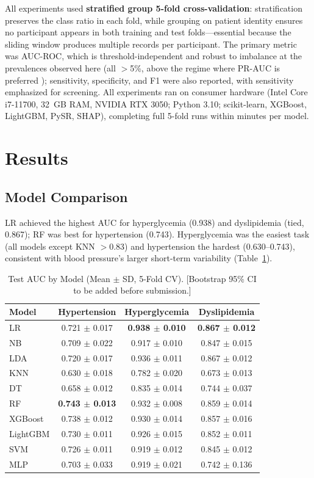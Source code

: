 \documentclass[journal]{IEEEtran}
\begin{document}
All experiments used \textbf{stratified group 5-fold cross-validation}: stratification preserves the class ratio in each fold, while grouping on patient identity ensures no participant appears in both training and test folds---essential because the sliding window produces multiple records per participant. The primary metric was AUC-ROC, which is threshold-independent and robust to imbalance at the prevalences observed here (all $>$5\%, above the regime where PR-AUC is preferred \cite{ref35}); sensitivity, specificity, and F1 were also reported, with sensitivity emphasized for screening. All experiments ran on consumer hardware (Intel Core i7-11700, 32~GB RAM, NVIDIA RTX 3050; Python 3.10; scikit-learn, XGBoost, LightGBM, PySR, SHAP), completing full 5-fold runs within minutes per model.

\section{Results}
\subsection{Model Comparison}
LR achieved the highest AUC for hyperglycemia (0.938) and dyslipidemia (tied, 0.867); RF was best for hypertension (0.743). Hyperglycemia was the easiest task (all models except KNN $>$0.83) and hypertension the hardest (0.630--0.743), consistent with blood pressure's larger short-term variability (Table~\ref{tab:auc}).

\begin{table}[!t]
\caption{Test AUC by Model (Mean $\pm$ SD, 5-Fold CV). [Bootstrap 95\% CI to be added before submission.]}
\label{tab:auc}
\centering
\begin{tabular}{@{}lccc@{}}
\toprule
Model & Hypertension & Hyperglycemia & Dyslipidemia \\
\midrule
LR & 0.721 $\pm$ 0.017 & \textbf{0.938 $\pm$ 0.010} & \textbf{0.867 $\pm$ 0.012} \\
NB & 0.709 $\pm$ 0.022 & 0.917 $\pm$ 0.010 & 0.847 $\pm$ 0.015 \\
LDA & 0.720 $\pm$ 0.017 & 0.936 $\pm$ 0.011 & 0.867 $\pm$ 0.012 \\
KNN & 0.630 $\pm$ 0.018 & 0.782 $\pm$ 0.020 & 0.673 $\pm$ 0.013 \\
DT & 0.658 $\pm$ 0.012 & 0.835 $\pm$ 0.014 & 0.744 $\pm$ 0.037 \\
RF & \textbf{0.743 $\pm$ 0.013} & 0.932 $\pm$ 0.008 & 0.859 $\pm$ 0.014 \\
XGBoost & 0.738 $\pm$ 0.012 & 0.930 $\pm$ 0.014 & 0.857 $\pm$ 0.016 \\
LightGBM & 0.730 $\pm$ 0.011 & 0.926 $\pm$ 0.015 & 0.852 $\pm$ 0.011 \\
SVM & 0.726 $\pm$ 0.011 & 0.919 $\pm$ 0.012 & 0.845 $\pm$ 0.012 \\
MLP & 0.703 $\pm$ 0.033 & 0.919 $\pm$ 0.021 & 0.742 $\pm$ 0.136 \\
\bottomrule
\end{tabular}
\end{table}
\end{document}
